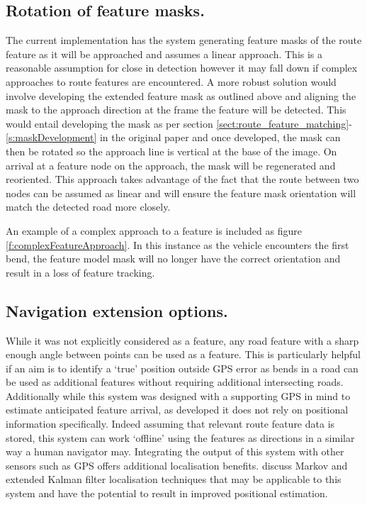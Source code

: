 \documentclass[]{aiaa-tc}%
\begin{document}
\subsection{Rotation of feature masks.} The current implementation has the system generating feature masks of the route feature as it will be approached and assumes a linear approach. This is a reasonable assumption for close in detection however it may fall down if complex approaches to route features are encountered. A more robust solution would involve developing the extended feature mask as outlined above and aligning the mask to the approach direction at the frame the feature will be detected. This would entail developing the mask as per section \ref{sect:route_feature_matching}-\ref{s:maskDevelopment} in the original paper and once developed, the mask can then be rotated so the approach line is vertical at the base of the image. On arrival at a feature node on the approach, the mask will be regenerated and reoriented. This approach takes advantage of the fact that the route between two nodes can be assumed as linear and will ensure the feature mask orientation will match the detected road more closely. 

An example of a complex approach to a feature is included as figure \ref{f:complexFeatureApproach}. In this instance as the vehicle encounters the first bend, the feature model mask will no longer have the correct orientation and result in a loss of feature tracking. 


\subsection{Navigation extension options.} While it was not explicitly considered as a feature, any road feature with a sharp enough angle between points can be used as a feature. This is particularly helpful if an aim is to identify a `true' position outside GPS error as bends in a road can be used as additional features without requiring additional intersecting roads. Additionally while this system was designed with a supporting GPS in mind to estimate anticipated feature arrival, as developed it does not rely on positional information specifically. Indeed assuming that relevant route feature data is stored, this system can work `offline' using the features as directions in a similar way a human navigator may. Integrating the output of this system with other sensors such as GPS offers additional localisation benefits. \citet{probabalisticRobotics} discuss Markov and extended Kalman filter localisation techniques that may be applicable to this system and have the potential to result in improved positional estimation.
\end{document}
